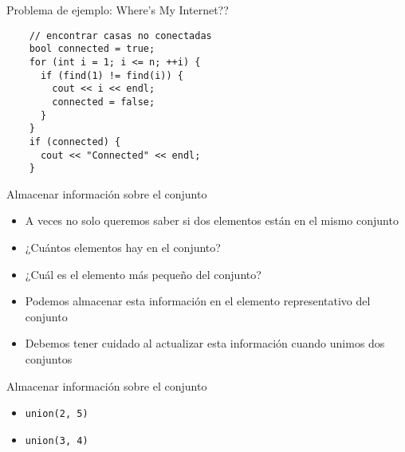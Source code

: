 \documentclass[10pt]{beamer}
\newcommand{\bi}{\begin{itemize}}
\newcommand{\ei}{\end{itemize}}
\begin{document}
\begin{frame}[fragile]{Problema de ejemplo: Where's My Internet??}
  \begin{verbatim}
    // encontrar casas no conectadas
    bool connected = true;
    for (int i = 1; i <= n; ++i) {
      if (find(1) != find(i)) {
        cout << i << endl;
        connected = false;
      }
    }
    if (connected) {
      cout << "Connected" << endl;
    }
  \end{verbatim}
\end{frame}

\begin{frame}{Almacenar información sobre el conjunto}
  \bi
    \item A veces no solo queremos saber si dos elementos están en el mismo conjunto
    \item ¿Cuántos elementos hay en el conjunto?
    \item ¿Cuál es el elemento más pequeño del conjunto?
    
    \vspace{20pt}

    \item<2-> Podemos almacenar esta información en el elemento representativo del conjunto
    \item<2-> Debemos tener cuidado al actualizar esta información cuando unimos dos conjuntos
  \ei
\end{frame}

\begin{frame}{Almacenar información sobre el conjunto}
  \begin{figure}
  \end{figure}

  \bi
    \item<2-> \texttt{union(2, 5)}
    \item<3-> \texttt{union(3, 4)}
  \ei
\end{frame}
\end{document}
